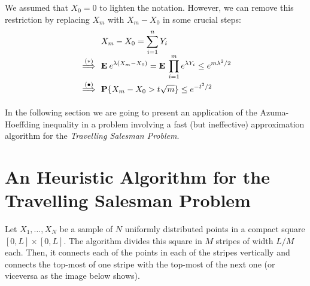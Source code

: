 
\begin{remark} We assumed that $X_0 = 0$ to lighten the notation. However, we can remove this restriction by replacing $X_m$ with $X_m - X_0$ in some crucial steps:
    \[\everymath{\displaystyle}\arraycolsep=1.8pt\def\arraystretch{1.8}
        \begin{array}{rl}
            & X_m-X_0 = \sum_{i = 1}^n Y_i\\
            \overset{(*)}{\implies} & \E e^{\lambda (X_m-X_0)} = \E \prod_{i = 1}^{m} e^{\lambda Y_i} \leq e^{m \lambda^2 / 2}\\
            \overset{(\bullet)}{\implies} & \P\{X_m-X_0 > t\sqrt{m}\} \leq e^{-t^2/2}
        \end{array} 
        \] 

\end{remark}    

In the following section we are going to present an application of the Azuma-Hoeffding inequality in a problem involving a fast (but ineffective) approximation algorithm for the \textit{Travelling Salesman Problem}. 

\section{An Heuristic Algorithm for the Travelling Salesman Problem}

Let $X_1,\ldots, X_N$ be a sample of $N$ uniformly distributed points in a compact square $[0,L]\times [0,L]$. The algorithm divides this square in $M$ stripes of width $L/M$ each. Then, it connects each of the points in each of the stripes vertically and connects the top-most of one stripe with the top-most of the next one (or viceversa as the image below shows).

